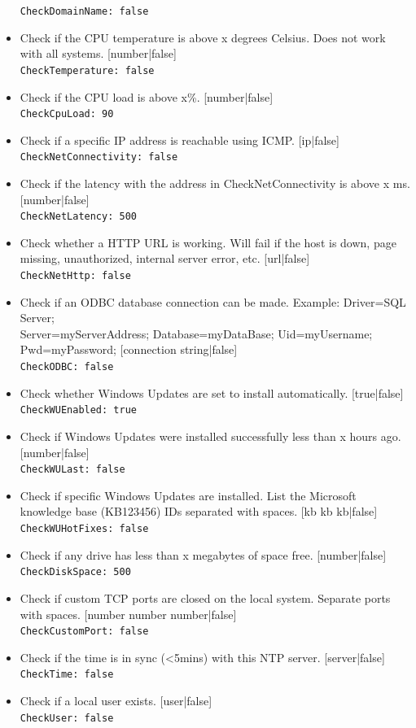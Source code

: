 \documentclass[11pt]{article}
\begin{document}
\begin{itemize}
\texttt{CheckDomainName: false}
\item Check if the CPU temperature is above x degrees Celsius. Does not work with all systems. [number|false]\\
\texttt{CheckTemperature: false}
\item Check if the CPU load is above x\%. [number|false]\\
\texttt{CheckCpuLoad: 90}
\item Check if a specific IP address is reachable using ICMP. [ip|false]\\
\texttt{CheckNetConnectivity: false}
\item Check if the latency with the address in CheckNetConnectivity is above x ms. [number|false]\\
\texttt{CheckNetLatency: 500}
\item Check whether a HTTP URL is working. Will fail if the host is down, page missing, unauthorized, internal server error, etc. [url|false]\\
\texttt{CheckNetHttp: false}
\item Check if an ODBC database connection can be made. Example: Driver={SQL Server};\\ Server=myServerAddress; Database=myDataBase; Uid=myUsername; Pwd=myPassword; [connection string|false]\\
\texttt{CheckODBC: false}
\item Check whether Windows Updates are set to install automatically. [true|false]\\
\texttt{CheckWUEnabled: true}
\item Check if Windows Updates were installed successfully less than x hours ago. [number|false]\\
\texttt{CheckWULast: false}
\item Check if specific Windows Updates are installed. List the Microsoft knowledge base (KB123456) IDs separated with spaces. [kb kb kb|false]\\
\texttt{CheckWUHotFixes: false}
\item Check if any drive has less than x megabytes of space free. [number|false]\\
\texttt{CheckDiskSpace: 500}
\item Check if custom TCP ports are closed on the local system. Separate ports with spaces. [number number number|false]\\
\texttt{CheckCustomPort: false}
\item Check if the time is in sync (<5mins) with this NTP server. [server|false]\\
\texttt{CheckTime: false}
\item Check if a local user exists. [user|false]\\
\texttt{CheckUser: false}
\end{itemize}
\end{document}
